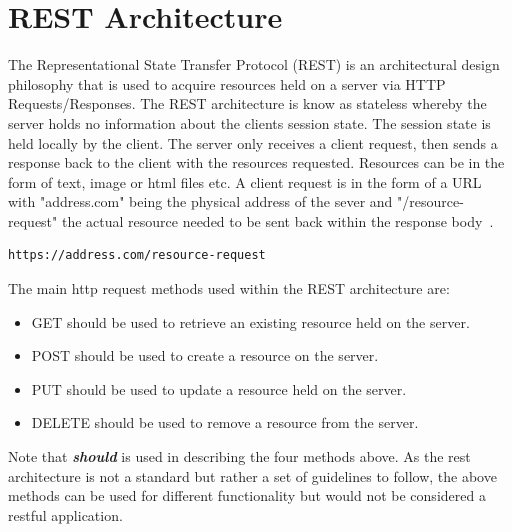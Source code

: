  
\section{REST Architecture}
The  Representational State Transfer Protocol (REST) is an architectural design philosophy that  is used to acquire resources held on a server via HTTP Requests/Responses. The REST architecture is know as stateless whereby the server holds no information about the clients session state. The session state is held locally by the client. The server only receives a client request, then sends a response back to the client with the resources requested. Resources can be in the form of text, image or html files etc. A client request is in the form of a URL with "address.com" being the physical address of the sever and "/resource-request" the actual resource needed to be sent back within the response body~\cite{Understa52:online}. 
\begin{verbatim}
https://address.com/resource-request
\end{verbatim} 
The main http request methods used within the REST architecture are:
\begin{itemize}
	\item GET should be used to retrieve an existing resource held on the server.
	\item POST should be used to create a resource on the server.
	\item PUT should be used to update a resource held on the server.
	\item DELETE should be used to remove a resource from the server.
\end{itemize}
Note that \textit{\textbf{should}} is used in describing the four methods above.
As the rest architecture is not a standard but rather a set of guidelines to follow, the above methods can be used for different functionality but would not be considered a restful application.
